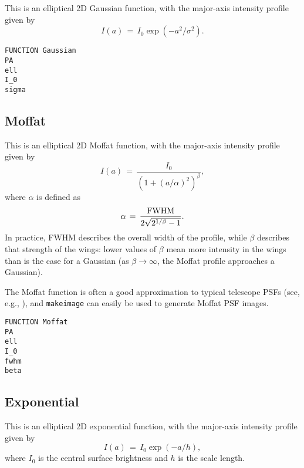 \documentclass[10pt]{article}
\newcommand{\makeimage}{\texttt{makeimage}}
\begin{document}
This is an elliptical 2D Gaussian function, with the major-axis intensity
profile given by
\begin{equation}
I(a) \, = \, I_{0} \exp(-a^2/\sigma^2).
\end{equation}

\begin{verbatim}
FUNCTION Gaussian
PA
ell
I_0
sigma
\end{verbatim}


\subsection{Moffat}

This is an elliptical 2D Moffat function, with the major-axis intensity profile
given by
\begin{equation}
I(a) \, = \, \frac{I_{0}  }{(1 + (a/\alpha)^{2})^{\beta} },
\end{equation}
where $\alpha$ is defined as
\begin{equation}
\alpha \, = \, \frac{ {\rm FWHM}}{2 \sqrt{2^{1/\beta} - 1}}.
\end{equation}
In practice, FWHM describes the overall width of the profile, while $\beta$ describes that
strength of the wings: lower values of $\beta$ mean more intensity in the wings
than is the case for a Gaussian (as $\beta \rightarrow \infty$, the Moffat profile
approaches a Gaussian).

The Moffat function is often a good approximation to typical telescope PSFs (see, e.g.,
\citealt{trujillo01}), and \makeimage{} can easily be used to generate Moffat PSF images.

\begin{verbatim}
FUNCTION Moffat
PA
ell
I_0
fwhm
beta
\end{verbatim}


%


\subsection{Exponential}

This is an elliptical 2D exponential function, with the major-axis intensity
profile given by
\begin{equation}
I(a) \, = \, I_{0} \exp(-a/h),
\end{equation}
where $I_{0}$ is the central surface brightness and $h$ is the scale length.
\end{document}
